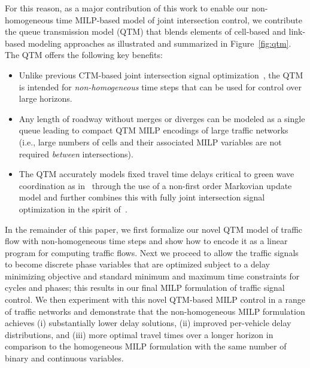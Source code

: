 For this reason, as a major contribution of this work to enable our
non-homogeneous time MILP-based model of joint intersection control, we
contribute the queue transmission model (QTM) that blends elements of
cell-based and link-based modeling approaches as illustrated
and summarized in Figure~\ref{fig:qtm}.  The QTM offers the following key benefits:
\begin{itemize}
%
\item  Unlike previous CTM-based joint intersection signal 
  optimization~, the QTM is
  intended for \emph{non-homogeneous} time steps that can
  be used for control over large horizons.  
%
\item Any length of roadway without merges or diverges can be modeled
  as a single queue leading to compact QTM MILP encodings of large traffic
  networks 
  (i.e., large numbers of cells and their associated MILP variables are
  not required \emph{between} intersections).
%
\item The QTM accurately models fixed travel time delays critical to green wave
  coordination as
  in~
  through the use of a non-first order Markovian update model and further combines this
  with fully joint intersection signal optimization in the spirit 
  of~.
\end{itemize}

In the remainder of this paper, we first formalize our
novel QTM model of traffic flow with non-homogeneous time steps and
show how to encode it as a linear program for computing traffic flows.
%
Next we proceed to allow the traffic signals to become discrete phase
variables that are optimized subject to a delay minimizing objective
and standard minimum and maximum time constraints for cycles and
phases; this results in our final MILP formulation of traffic signal
control.
%
We then experiment with this novel QTM-based MILP control in a range
of traffic networks and demonstrate that the non-homogeneous MILP
formulation achieves (i) substantially lower delay solutions, (ii)
improved per-vehicle delay distributions, and (iii) more optimal travel
times over a longer horizon in comparison to the homogeneous MILP
formulation with the same number of binary and continuous variables.

